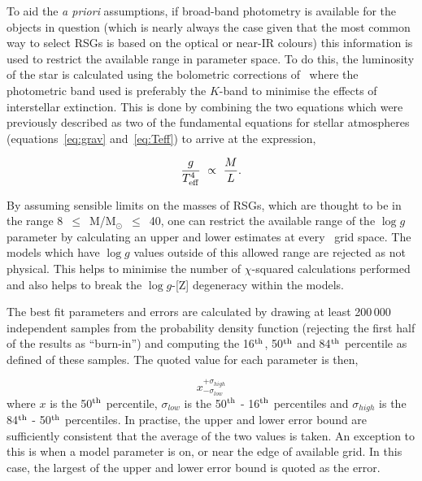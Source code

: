 To aid the {\it a priori} assumptions, if broad-band photometry is available for the objects in question
(which is nearly always the case given that the most common way to select RSGs is based on the optical or near-IR colours) this information is used to restrict the available range in parameter space.
To do this, the luminosity of the star is calculated using the bolometric corrections of~\citet{2013ApJ...767....3D} where the photometric band used is preferably the $K$-band to minimise the effects of interstellar extinction.
This is done by combining the two equations which were previously described as two of the fundamental equations for stellar atmospheres (equations~\ref{eq:grav} and~\ref{eq:Teff}) to arrive at the expression,

\begin{equation}
    \frac{g}{T^{4}_{\rm eff}}~\propto~\frac{M}{L}.
\end{equation}

By assuming sensible limits on the masses of RSGs, which are thought to be in the range 8~$\leq$~M/M$_{\odot}$~$\leq$~40, one can restrict the available range of the $\log g$ parameter by calculating an upper and lower estimates at every \Teff~grid space.
The models which have $\log g$ values outside of this allowed range are rejected as not physical.
This helps to minimise the number of $\chi$-squared calculations performed and also helps to break the $\log g$-[Z] degeneracy within the models.

The best fit parameters and errors are calculated by drawing at least 200\,000 independent samples from the probability density function (rejecting the first half of the results as ``burn-in'') and computing the
16$^{\rm th}$, 50$^{\rm th}$ and 84$^{\rm th}$ percentile as defined of these samples.
The quoted value for each parameter is then,

\begin{equation}
     x_{-\sigma_{low}}^{+\sigma_{high}}
\end{equation}
\noindent where $x$ is the 50$^{\rm th}$ percentile, $\sigma_{low}$ is the 50$^{\rm th}$ - 16$^{\rm th}$ percentiles and $\sigma_{high}$ is the 84$^{\rm th}$ - 50$^{\rm th}$ percentiles.
In practise, the upper and lower error bound are sufficiently consistent that the average of the two values is taken.
An exception to this is when a model parameter is on, or near the edge of available grid.
In this case, the largest of the upper and lower error bound is quoted as the error.




